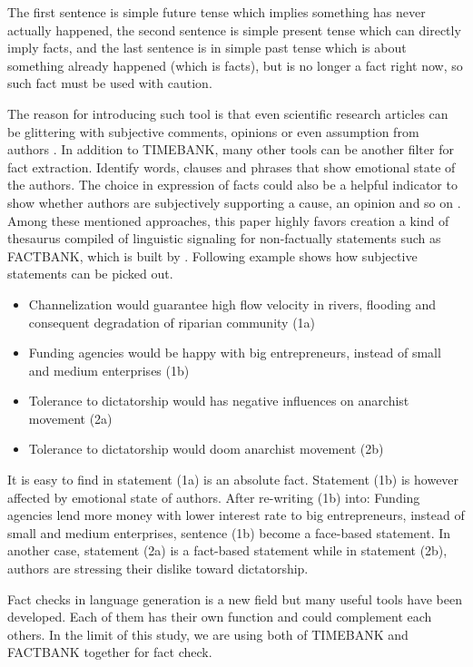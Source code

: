 The first sentence is simple future tense which implies something has never actually happened, the second sentence is simple present tense which can directly imply facts,
and the last sentence is in simple past tense which is about something already happened (which is facts),
but is no longer a fact right now, so such fact must be used with caution. 

The reason for introducing such tool is that even scientific research articles can be glittering with subjective comments, opinions or even assumption from authors \cite{schultze2000confessional}. In addition to TIMEBANK, many other tools can be another filter for fact extraction. 
\cite{Dave2003mining} Identify words, clauses and phrases that show emotional state of the authors. 
The choice in expression of facts could also be a helpful indicator to show whether authors are subjectively supporting a cause, an opinion and so on \cite{Wiebe2005}. 
Among these mentioned approaches, this paper highly favors creation a kind of thesaurus compiled of linguistic signaling for non-factually statements such as FACTBANK,
which is built by \cite{Sauri2009}. 
Following example shows how subjective statements can be picked out.

\begin{itemize}
	\item Channelization would guarantee high flow velocity in rivers, flooding and consequent degradation of riparian community (1a)
	\item Funding agencies would be happy with big entrepreneurs, instead of small and medium enterprises (1b)
	\item Tolerance to dictatorship would has negative influences on anarchist movement (2a)
	\item Tolerance to dictatorship would doom anarchist movement (2b)
\end{itemize}

It is easy to find in statement (1a) is an absolute fact. 
Statement (1b) is however affected by emotional state of authors. 
After re-writing (1b) into: Funding agencies lend more money with lower interest rate to big entrepreneurs, instead of small and medium enterprises,
sentence (1b) become a face-based statement. 
In another case, statement (2a) is a fact-based statement while in statement (2b), authors are stressing their dislike toward dictatorship.

Fact checks in language generation is a new field but many useful tools have been developed. 
Each of them has their own function and could complement each others. 
In the limit of this study, we are using both of TIMEBANK and FACTBANK together for fact check.



